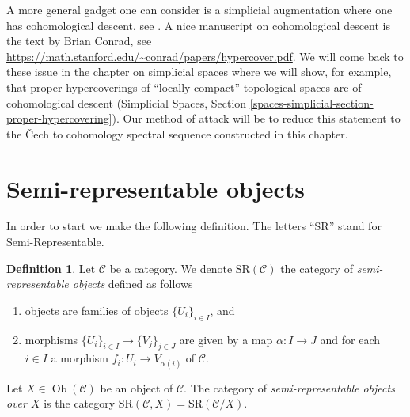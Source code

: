 \documentclass{stacks-project}
\theoremstyle{plain}
\theoremstyle{definition}
\newtheorem{definition}[subsection]{Definition}
\theoremstyle{remark}
\numberwithin{equation}{subsection}
\def\Ob{\mathop{\mathrm{Ob}}\nolimits}
\begin{document}
\medskip\noindent
A more general gadget one can consider is a simplicial augmentation where
one has cohomological descent, see \cite[Expos\'e Vbis]{SGA4}. A nice
manuscript on cohomological descent is the text by Brian Conrad, see
\url{https://math.stanford.edu/~conrad/papers/hypercover.pdf}.
We will come back to these issue in the chapter on simplicial spaces
where we will show, for example, that proper hypercoverings of
``locally compact'' topological spaces are of cohomological
descent (Simplicial Spaces, Section
\ref{spaces-simplicial-section-proper-hypercovering}).
Our method of attack will be to reduce this statement to the {\v C}ech to
cohomology spectral sequence constructed in this chapter.






























\section{Semi-representable objects}
\label{section-semi-representable}

\noindent
In order to start we make the following definition.
The letters ``SR'' stand for Semi-Representable.

\begin{definition}
\label{definition-SR}
Let $\mathcal{C}$ be a category. We denote $\text{SR}(\mathcal{C})$
the category of {\it semi-representable objects} defined as follows
\begin{enumerate}
\item objects are families of objects $\{U_i\}_{i \in I}$, and
\item morphisms $\{U_i\}_{i \in I} \to \{V_j\}_{j \in J}$ are given by
a map $\alpha : I \to J$ and for each $i \in I$
a morphism $f_i : U_i \to V_{\alpha(i)}$ of $\mathcal{C}$.
\end{enumerate}
Let $X \in \Ob(\mathcal{C})$ be an object of $\mathcal{C}$.
The category of {\it semi-representable objects over $X$}
is the category
$\text{SR}(\mathcal{C}, X) = \text{SR}(\mathcal{C}/X)$.
\end{definition}
\end{document}
